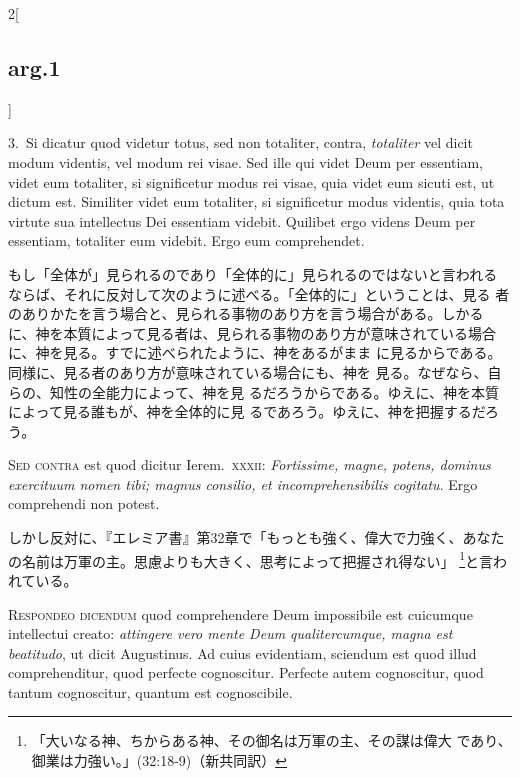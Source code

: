 \documentclass[paper=a4paper,fontsize=10pt,jafontsize=9pt,titlepage]{jlreq}
\begin{document}
\begin{paracol}{2}[\subsection{arg.1}]
\switchcolumn*

3.~Si dicatur quod videtur totus, sed non totaliter, contra, {\itshape
totaliter} vel dicit modum videntis, vel modum rei visae. Sed ille qui
videt Deum per essentiam, videt eum totaliter, si significetur modus
rei visae, quia videt eum sicuti est, ut dictum est. Similiter videt
eum totaliter, si significetur modus videntis, quia tota virtute sua
intellectus Dei essentiam videbit. Quilibet ergo videns Deum per
essentiam, totaliter eum videbit. Ergo eum comprehendet.

\switchcolumn

もし「全体が」見られるのであり「全体的に」見られるのではないと言われる
ならば、それに反対して次のように述べる。「全体的に」ということは、見る
者のありかたを言う場合と、見られる事物のあり方を言う場合がある。しかる
に、神を本質によって見る者は、見られる事物のあり方が意味されている場合
に、神を見る。すでに述べられたように、神をあるがまま
に見るからである。同様に、見る者のあり方が意味されている場合にも、神を
見る。なぜなら、自らの、知性の全能力によって、神を見
るだろうからである。ゆえに、神を本質によって見る誰もが、神を全体的に見
るであろう。ゆえに、神を把握するだろう。

\switchcolumn*[\subsection{s.c.}]

{\scshape  Sed contra} est quod dicitur Ierem.\ {\scshape xxxii}: {\itshape Fortissime,
 magne, potens, dominus exercituum nomen tibi; magnus consilio, et
 incomprehensibilis cogitatu}. Ergo comprehendi non potest.

\switchcolumn

しかし反対に、『エレミア書』第32章で「もっとも強く、偉大で力強く、あなた
の名前は万軍の主。思慮よりも大きく、思考によって把握され得ない」
\footnote{「大いなる神、ちからある神、その御名は万軍の主、その謀は偉大
であり、御業は力強い。」(32:18-9)（新共同訳）}と言われている。


{\scshape Respondeo dicendum} quod comprehendere Deum impossibile est
cuicumque intellectui creato: {\itshape attingere vero mente Deum
qualitercumque, magna est beatitudo}, ut dicit Augustinus. Ad cuius
evidentiam, sciendum est quod illud comprehenditur, quod perfecte
cognoscitur. Perfecte autem cognoscitur, quod tantum cognoscitur,
quantum est cognoscibile.


\end{paracol}
\end{document}

